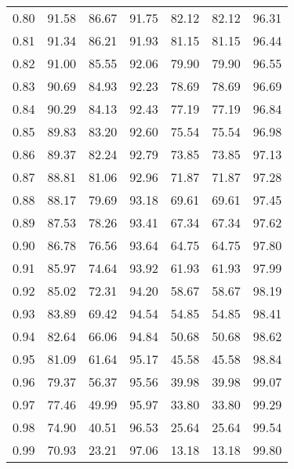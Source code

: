 \begin{tabular}{|c|c|c|c|c|c|c|}
      0.80 &     91.58 &     86.67 &      91.75 &   82.12 &      82.12 &         96.31 \\
      0.81 &     91.34 &     86.21 &      91.93 &   81.15 &      81.15 &         96.44 \\
      0.82 &     91.00 &     85.55 &      92.06 &   79.90 &      79.90 &         96.55 \\
      0.83 &     90.69 &     84.93 &      92.23 &   78.69 &      78.69 &         96.69 \\
      0.84 &     90.29 &     84.13 &      92.43 &   77.19 &      77.19 &         96.84 \\
      0.85 &     89.83 &     83.20 &      92.60 &   75.54 &      75.54 &         96.98 \\
      0.86 &     89.37 &     82.24 &      92.79 &   73.85 &      73.85 &         97.13 \\
      0.87 &     88.81 &     81.06 &      92.96 &   71.87 &      71.87 &         97.28 \\
      0.88 &     88.17 &     79.69 &      93.18 &   69.61 &      69.61 &         97.45 \\
      0.89 &     87.53 &     78.26 &      93.41 &   67.34 &      67.34 &         97.62 \\
      0.90 &     86.78 &     76.56 &      93.64 &   64.75 &      64.75 &         97.80 \\
      0.91 &     85.97 &     74.64 &      93.92 &   61.93 &      61.93 &         97.99 \\
      0.92 &     85.02 &     72.31 &      94.20 &   58.67 &      58.67 &         98.19 \\
      0.93 &     83.89 &     69.42 &      94.54 &   54.85 &      54.85 &         98.41 \\
      0.94 &     82.64 &     66.06 &      94.84 &   50.68 &      50.68 &         98.62 \\
      0.95 &     81.09 &     61.64 &      95.17 &   45.58 &      45.58 &         98.84 \\
      0.96 &     79.37 &     56.37 &      95.56 &   39.98 &      39.98 &         99.07 \\
      0.97 &     77.46 &     49.99 &      95.97 &   33.80 &      33.80 &         99.29 \\
      0.98 &     74.90 &     40.51 &      96.53 &   25.64 &      25.64 &         99.54 \\
      0.99 &     70.93 &     23.21 &      97.06 &   13.18 &      13.18 &         99.80 \\
\bottomrule
\end{tabular}
